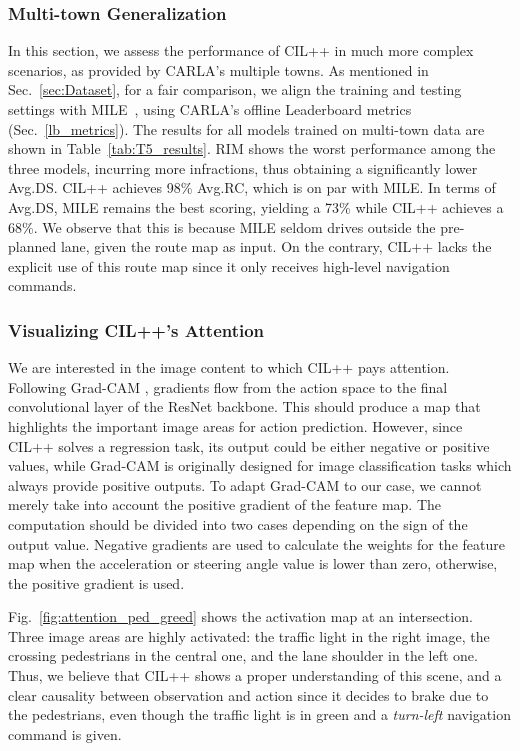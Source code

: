 \subsubsection{Multi-town Generalization}\label{sec:multi_towns_result}
In this section, we assess the performance of CIL++ in much more complex scenarios, as provided by CARLA's multiple towns. 
As mentioned in Sec.~\ref{sec:Dataset}, for a fair comparison, we align the training and testing settings with MILE~\cite{Hu:2022}, using CARLA's offline Leaderboard metrics (Sec.~\ref{lb_metrics}).
The results for all models trained on multi-town data are shown in Table~\ref{tab:T5_results}. 
RIM shows the worst performance among the three models, incurring more infractions, thus obtaining a significantly lower Avg.DS. 
CIL++ achieves 98\% Avg.RC, which is on par with MILE. 
In terms of Avg.DS, MILE remains the best scoring, yielding a 73\% while CIL++ achieves a 68\%. 
We observe that this is because MILE seldom drives outside the pre-planned lane, given the route map as input. 
On the contrary, CIL++ lacks the explicit use of this route map since it only receives high-level navigation commands. 


\subsubsection{Visualizing CIL++'s Attention}
\label{sec:Visualization}
We are  interested in the image content to which CIL++ pays attention. 
Following Grad-CAM \cite{Selvaraju:2017}, gradients flow from the action space to the final convolutional layer of the ResNet backbone. 
This should produce a map that highlights the important image areas for action prediction. 
However, since CIL++ solves a regression task, its output could be either negative or positive values, while Grad-CAM is originally designed for image classification tasks which always provide positive outputs. 
To adapt Grad-CAM to our case, we cannot merely take into account the positive gradient of the feature map. 
The computation should be divided into two cases depending on the sign of the output value. 
Negative gradients are used to calculate the weights for the feature map when the acceleration or steering angle value is lower than zero, otherwise, the positive gradient is used.


Fig.~\ref{fig:attention_ped_greed} shows the activation map at an intersection. 
Three image areas are highly activated: the traffic light in the right image, the crossing pedestrians in the central one, and the lane shoulder in the left one. 
Thus, we believe that CIL++ shows a proper understanding of this scene, and a clear causality between observation and action since it decides to brake due to the pedestrians, even though the traffic light is in green and a \emph{turn-left} navigation command is given.

